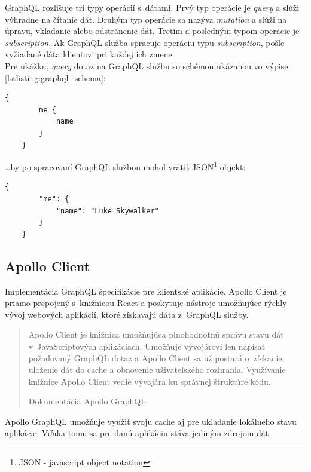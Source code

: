 \noindent GraphQL rozlišuje tri typy operácií s~dátami. Prvý typ operácie je \emph{query} a slúži výhradne na čítanie dát. Druhým typ operácie sa nazýva \emph{mutation} a slúži na úpravu, vkladanie alebo odstránenie dát. Tretím a posledným typom operácie je \emph{subscription}. Ak GraphQL služba spracuje operáciu typu \emph{subscription}, pošle vyžiadané dáta klientovi pri každej ich zmene. \\

\noindent Pre ukážku, \emph{query} dotaz na GraphQL službu so schémou ukázanou vo výpise \ref{lstlisting:graphql_schema}: \\

\begin{lstlisting}[caption=Príklad \emph{query} dotazu na GraphQL službu. \cite{GraphQL}]
	{
		me {
			name
		}
	}
\end{lstlisting}

\bigskip

\ldots by po spracovaní GraphQL službou mohol vrátiť JSON\footnote{JSON - javascript object notation} objekt: \\

\begin{lstlisting}[caption=Príklad dát obdržaných z~GraphQL služby. \cite{GraphQL}]
	{
		"me": {
			"name": "Luke Skywalker"
		}
	}
\end{lstlisting}

\subsection{Apollo Client}
\label{subsection:apollo_client}
Implementácia GraphQL špecifikácie pre klientské aplikácie. Apollo Client je priamo prepojený s~knižnicou React a poskytuje nástroje umožňujúce rýchly vývoj webových aplikácií, ktoré získavajú dáta z~GraphQL služby. \\

\blockquote[Dokumentácia Apollo GraphQL \cite{Apollo}]{Apollo Client je knižnica umožňujúca plnohodnotnú správu stavu dát v~JavaScriptových aplikáciach. Umožňuje vývojárovi len napísať požadovaný GraphQL dotaz a Apollo Client sa už postará o~získanie, uloženie dát do cache a obnovenie uživateľského rozhrania. Využívanie knižnice Apollo Client vedie vývojára ku správnej štruktúre kódu.}

\bigskip

\noindent Apollo GraphQL umožňuje využiť svoju cache aj pre ukladanie lokálneho stavu aplikácie. Vďaka tomu sa pre danú aplikáciu stáva jediným zdrojom dát.

